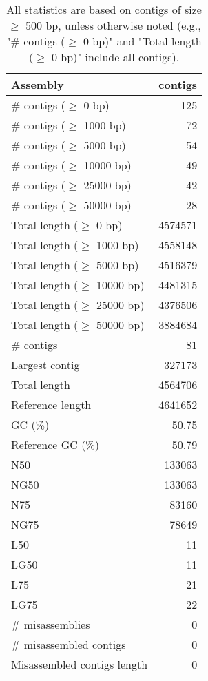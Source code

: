 \documentclass[12pt,a4paper]{article}
\begin{document}
\begin{table}[ht]
\begin{center}
\caption{All statistics are based on contigs of size $\geq$ 500 bp, unless otherwise noted (e.g., "\# contigs ($\geq$ 0 bp)" and "Total length ($\geq$ 0 bp)" include all contigs).}
\begin{tabular}{|l*{1}{|r}|}
\hline
Assembly & contigs \\ \hline
\# contigs ($\geq$ 0 bp) & 125 \\ \hline
\# contigs ($\geq$ 1000 bp) & 72 \\ \hline
\# contigs ($\geq$ 5000 bp) & 54 \\ \hline
\# contigs ($\geq$ 10000 bp) & 49 \\ \hline
\# contigs ($\geq$ 25000 bp) & 42 \\ \hline
\# contigs ($\geq$ 50000 bp) & 28 \\ \hline
Total length ($\geq$ 0 bp) & 4574571 \\ \hline
Total length ($\geq$ 1000 bp) & 4558148 \\ \hline
Total length ($\geq$ 5000 bp) & 4516379 \\ \hline
Total length ($\geq$ 10000 bp) & 4481315 \\ \hline
Total length ($\geq$ 25000 bp) & 4376506 \\ \hline
Total length ($\geq$ 50000 bp) & 3884684 \\ \hline
\# contigs & 81 \\ \hline
Largest contig & 327173 \\ \hline
Total length & 4564706 \\ \hline
Reference length & 4641652 \\ \hline
GC (\%) & 50.75 \\ \hline
Reference GC (\%) & 50.79 \\ \hline
N50 & 133063 \\ \hline
NG50 & 133063 \\ \hline
N75 & 83160 \\ \hline
NG75 & 78649 \\ \hline
L50 & 11 \\ \hline
LG50 & 11 \\ \hline
L75 & 21 \\ \hline
LG75 & 22 \\ \hline
\# misassemblies & 0 \\ \hline
\# misassembled contigs & 0 \\ \hline
Misassembled contigs length & 0 \\ \hline

\end{tabular}
\end{center}
\end{table}
\end{document}
